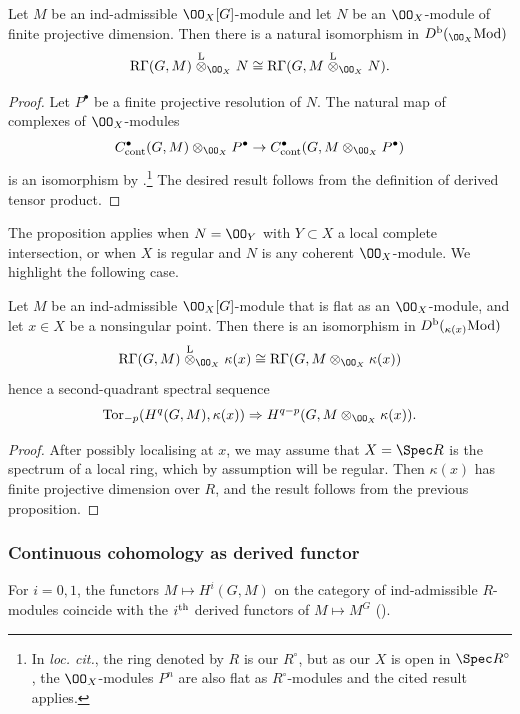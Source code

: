  \begin{prop}
\notready\label{base change} Let $M$ be an ind-admissible $\OO_{X}[G]$-module and let $N$ be an $\OO_{X}$-module of finite projective dimension. Then  there is a natural isomorphism  in $D^{\rm b}({}_{\OO_{X}}{\rm Mod})$
 $$  {\rm R}\Gamma(G, M) \stackrel{\rm L}\otimes_{\OO_{X}} N\cong  {\rm R}\Gamma(G, M \stackrel{\rm L}\otimes_{\OO_{X}} N). $$
  \end{prop}
 \begin{proof} Let $P^{\bullet}$ be a finite projective resolution of $N$.   The natural map  of complexes of $\OO_{X}$-modules
$$C_{\rm cont}^{\bullet}(G, M)\otimes_{\OO_{X} }P^{\bullet}\to  C_{\rm cont}^{\bullet}(G, M\otimes_{\OO_{X}}P^{\bullet})$$
 is an isomorphism by   \cite[(3.4.4)]{nek-selmer}.\footnote{In \emph{loc. cit.}, the ring denoted by $R$ is our $R^{\circ}$, but as our $X$ is open in $\Spec R^{\circ}$, the $\OO_{X}$-modules $P^{n}$ are also flat as $R^{\circ}$-modules and the  cited result applies.} The desired result follows from the definition of derived tensor product.
 \end{proof}
The proposition applies when $N=\OO_{Y}$ with $Y\subset X$  a local complete intersection,
or when  $X$ is regular and $N$ is any coherent $\OO_{X}$-module.
 We highlight the following case.
 \begin{coro}   \label{base change cor}
 Let $M$ be an ind-admissible $\OO_{X}[G]$-module that is flat as an $\OO_{X}$-module, and let $x\in X$ be a nonsingular point. Then there is an isomorphism in $D^{\rm b}({}_{\kappa(x)}{\rm Mod})$
 $$ {\rm R}\Gamma(G, M) \stackrel{\rm L}\otimes_{\OO_{X}} \kappa(x)\cong
 {\rm R}\Gamma(G, M \otimes_{\OO_{X}} \kappa(x)) $$
 hence a second-quadrant spectral sequence
 $${\rm Tor}_{-p}(H^{q}(G, M), \kappa(x)) \Rightarrow  H^{q-p}(G , M\otimes_{\OO_{X}}\kappa(x)).$$
 \end{coro}
\begin{proof} After possibly localising at $x$, we may assume that $X=\Spec R$ is the spectrum of a  local ring, which by assumption will be regular. Then
 $\kappa(x)$   has finite projective dimension over $R$, and the result follows from the previous proposition.
\end{proof}

\subsubsection{Continuous cohomology as derived functor} For $i=0, 1$, the functors $M\mapsto H^{i}(G,M)$ on the category of ind-admissible $R$-modules  coincide with the $i^{\rm th}$ derived functors of $M\mapsto M^{G}$ (\cite[(3.6.2)(v)]{nek-selmer}).


